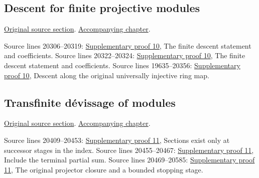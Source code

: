 \subsection{Descent for finite projective modules}
\hypertarget{algebra-source-section-finite-projective}{}
\noindent\href{https://github.com/stacks/stacks-project/blob/a04446e57ec1fbc252a871afcec7752fb2807b14/algebra.tex\#L20274}{Original source section}. \href{algebra.pdf\#nameddest=section-finite-projective}{Accompanying chapter}.

\begin{AlgebraSourceRoutes}
 Source lines 20306--20319: \hyperlink{algebra_open_loci_pure_descent_notes_20260927}{Supplementary proof 10}, The finite descent statement and coefficients.
 Source lines 20322--20324: \hyperlink{algebra_open_loci_pure_descent_notes_20260927}{Supplementary proof 10}, The finite descent statement and coefficients.
 Source lines 19635--20356: \hyperlink{algebra_open_loci_pure_descent_notes_20260927}{Supplementary proof 10}, Descent along the original universally injective ring map.
\end{AlgebraSourceRoutes}

\subsection{Transfinite d\'evissage of modules}
\hypertarget{algebra-source-section-transfinite-devissage}{}
\noindent\href{https://github.com/stacks/stacks-project/blob/a04446e57ec1fbc252a871afcec7752fb2807b14/algebra.tex\#L20374}{Original source section}. \href{algebra.pdf\#nameddest=section-transfinite-devissage}{Accompanying chapter}.

\begin{AlgebraSourceRoutes}
 Source lines 20409--20453: \hyperlink{algebra_transfinite_devissage_notes_20260927}{Supplementary proof 11}, Sections exist only at successor stages in the index.
 Source lines 20455--20467: \hyperlink{algebra_transfinite_devissage_notes_20260927}{Supplementary proof 11}, Include the terminal partial sum.
 Source lines 20469--20585: \hyperlink{algebra_transfinite_devissage_notes_20260927}{Supplementary proof 11}, The original projector closure and a bounded stopping stage.
\end{AlgebraSourceRoutes}

